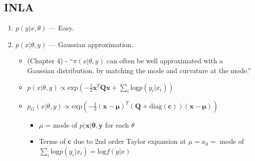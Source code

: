 \documentclass{article}
\begin{document}
\subsection*{INLA}
\begin{enumerate}

\item $p(y|x,\theta)$ --- Easy.

\item $p(x|\theta, y)$ --- Gaussian approximation.
      \begin{itemize}
      \item \cite{Rue2005} (Chapter 4) - ``$\pi(x|\theta,y)$ can often be well approximated with a Gaussian distribution, by matching the mode and curvature at the mode.''
      \end{itemize}
      
\cite{Rue2007}
      \begin{itemize}
      \item $p(x|\theta,y) \propto \text{exp}\left(-\frac{1}{2}\pmb{x}^{T}\pmb{Qx} + \sum_{i} \text{log}p(y_{i}|x_{i}) \right)$ 
      \item $p_{G}(x|\theta,y) \propto \text{exp} \left( -\frac{1}{2}(\pmb{x-\mu})^{T} (\pmb{Q} + \text{diag}(\pmb{c}) ) (\pmb{x - \mu}) \right)$
                \begin{itemize}
                \item $\mu$ = mode of $p(\pmb{x}|\pmb{\theta, y}$ for each $\theta$ \citep{Rue2007}
                \item Terms of $\pmb{c}$ due to 2nd order Taylor expansion at $\mu = x_{0} =$ mode of $\sum_{i} \text{log}p(y_{i}|x_{i}) = \text{log}f(y|x)$
                \end{itemize}
      \end{itemize}
      

\end{enumerate}
\end{document}
